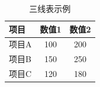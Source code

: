 \documentclass{article}
\begin{document}
\begin{table}[htbp]
  \centering
  \caption{三线表示例}
    \begin{tabular}{lcc}
    \toprule
    项目 & 数值1 & 数值2 \\
    \midrule
    项目A & 100 & 200 \\
    项目B & 150 & 250 \\
    项目C & 120 & 180 \\
    \bottomrule
    \end{tabular}
  \label{tab:random_table}
\end{table}
\end{document}
